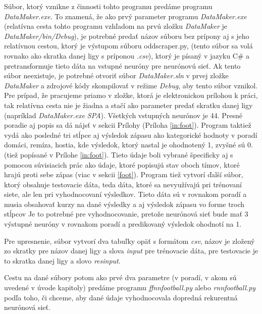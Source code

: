 Súbor, ktorý vznikne z činnosti tohto programu predáme programu \textit{DataMaker.exe}. 
To znamená, že ako prvý parameter programu \textit{DataMaker.exe} (relatívna cesta tohto programu vzhľadom na prvú zložku \textit{DataMaker} je \textit{DataMaker/bin/Debug}), je potrebné predať názov súboru bez prípony aj s jeho relatívnou cestou, ktorý je výstupom súboru oddscraper.py, (tento súbor sa volá rovnako ako skratka danej ligy s príponou \textit{.csv}), ktorý je písaný v jazyku C\# a pretransformuje tieto dáta na vstupné neuróny pre neurónovú sieť. 
Ak tento súbor neexistuje, je potrebné otvoriť súbor \textit{DataMaker.sln} v prvej zložke \textit{DataMaker} a zdrojové kódy skompilovať v režime \textit{Debug}, aby tento súbor vznikol.
Pre prípad, že pracujeme priamo v zložke, ktorá je elektronickou prílohou k práci, tak relatívna cesta nie je žiadna a stačí ako parameter predať skratku danej ligy (napríklad \textit{DataMaker.exe SPA}).
Všetkých vstupných neurónov je 44. 
Presné poradie aj popis sa dá nájsť v sekcii Prílohy (Príloha \ref{in:foot}).
Program taktiež vydá ako posledné tri stĺpce aj výsledok zápasu ako kategorické hodnoty v poradí domáci, remíza, hostia, kde výsledok, ktorý nastal je ohodnotený 1, zvyšné sú 0. (tiež popísané v Prílohe \ref{in:foot}).
Tieto údaje boli vybrané špecificky aj s pomocou súvisiacich prác ako údaje, ktoré popisujú stav oboch tímov, ktoré hrajú proti sebe zápas (viac v sekcii \ref{foot}). 
Program tiež vytvorí ďalší súbor, ktorý obsahuje testovacie dáta, teda dáta, ktoré sa nevyužívajú pri trénovaní siete, ale len pri vyhodnocovaní výsledkov. 
Tieto dáta sú v rovnakom poradí a musia obsahovať kurzy na dané výsledky a aj výsledok zápasu vo forme troch stĺpcov 
Je to potrebné pre vyhodnocovanie, pretože neurónová sieť bude mať 3 výstupné neuróny v rovnakom poradí a predikovaný výsledok ohodnotí na 1.

Pre upresnenie, súbor vytvorí dva tabuľky opäť s formátom \textit{csv}, názov je zložený zo skratky pre názov danej ligy a slova \textit{input} pre trénovacie dáta, pre testovacie je to skratka danej ligy a slovo \textit{resinput}.

Cestu na dané súbory potom ako prvé dva parametre (v poradí, v akom sú uvedené v úvode kapitoly) predáme programu \textit{ffnnfootball.py} alebo \textit{rnnfootball.py} podľa toho, či chceme, aby dané údaje vyhodnocovala dopredná rekurentná neurónová sieť.

